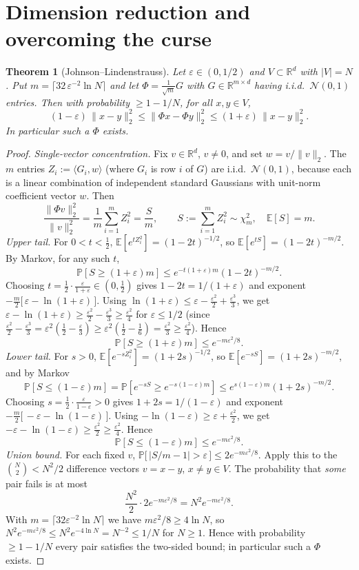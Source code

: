 \documentclass{amsart}
\newtheorem{theorem}{Theorem}
\newcommand{\R}{\mathbb{R}}
\newcommand{\E}{\mathbb{E}}
\renewcommand{\Pr}{\mathbb{P}}
\newcommand{\eps}{\varepsilon}
\begin{document}
\section{Dimension reduction and overcoming the curse}

\begin{theorem}[Johnson--Lindenstrauss]\label{thm:jl}
Let $\eps\in(0,1/2)$ and $V\subset\R^d$ with $|V|=N$.  Put
$m=\big\lceil 32\,\eps^{-2}\ln N\big\rceil$ and let $\Phi=\frac{1}{\sqrt m}G$ with
$G\in\R^{m\times d}$ having i.i.d.\ $\mathcal N(0,1)$ entries.  Then with probability
$\ge 1-1/N$, for all $x,y\in V$,
\[
(1-\eps)\,\|x-y\|_2^2 \le \|\Phi x-\Phi y\|_2^2 \le (1+\eps)\,\|x-y\|_2^2 .
\]
In particular such a $\Phi$ exists.
\end{theorem}
\begin{proof}
\emph{Single-vector concentration.}  Fix $v\in\R^d$, $v\ne 0$, and set
$w=v/\|v\|_2$.  The $m$ entries $Z_i:=\langle G_i,w\rangle$ (where $G_i$ is row $i$ of
$G$) are i.i.d.\ $\mathcal N(0,1)$, because each is a linear combination of independent
standard Gaussians with unit-norm coefficient vector $w$.  Then
\[
\frac{\|\Phi v\|_2^2}{\|v\|_2^2}=\frac1m\sum_{i=1}^m Z_i^2=\frac{S}{m},
\qquad S:=\sum_{i=1}^m Z_i^2\sim\chi^2_m,\quad \E[S]=m .
\]
\emph{Upper tail.}  For $0<t<\tfrac12$, $\E[e^{tZ_i^2}]=(1-2t)^{-1/2}$, so
$\E[e^{tS}]=(1-2t)^{-m/2}$.  By Markov, for any such $t$,
\[
\Pr[S\ge(1+\eps)m]\le e^{-t(1+\eps)m}(1-2t)^{-m/2}.
\]
Choosing $t=\tfrac12\cdot\tfrac{\eps}{1+\eps}\in(0,\tfrac12)$ gives $1-2t=1/(1+\eps)$
and exponent $-\tfrac m2\big[\,\eps-\ln(1+\eps)\,\big]$.  Using
$\ln(1+\eps)\le \eps-\tfrac{\eps^2}{2}+\tfrac{\eps^3}{3}$, we get
$\eps-\ln(1+\eps)\ge \tfrac{\eps^2}{2}-\tfrac{\eps^3}{3}\ge \tfrac{\eps^2}{4}$ for
$\eps\le 1/2$ (since $\tfrac{\eps^2}{2}-\tfrac{\eps^3}{3}=\eps^2(\tfrac12-\tfrac\eps3)
\ge\eps^2(\tfrac12-\tfrac16)=\tfrac{\eps^2}{3}\ge\tfrac{\eps^2}{4}$).  Hence
\[
\Pr[S\ge(1+\eps)m]\le e^{-m\eps^2/8}.
\]
\emph{Lower tail.}  For $s>0$, $\E[e^{-sZ_i^2}]=(1+2s)^{-1/2}$, so
$\E[e^{-sS}]=(1+2s)^{-m/2}$, and by Markov
\[
\Pr[S\le(1-\eps)m]=\Pr[e^{-sS}\ge e^{-s(1-\eps)m}]
\le e^{s(1-\eps)m}(1+2s)^{-m/2}.
\]
Choosing $s=\tfrac12\cdot\tfrac{\eps}{1-\eps}>0$ gives $1+2s=1/(1-\eps)$ and exponent
$-\tfrac m2\big[\,-\eps-\ln(1-\eps)\,\big]$.  Using
$-\ln(1-\eps)\ge \eps+\tfrac{\eps^2}{2}$, we get
$-\eps-\ln(1-\eps)\ge \tfrac{\eps^2}{2}\ge\tfrac{\eps^2}{4}$.  Hence
\[
\Pr[S\le(1-\eps)m]\le e^{-m\eps^2/8}.
\]
\emph{Union bound.}  For each fixed $v$,
$\Pr\big[\,|S/m-1|>\eps\,\big]\le 2e^{-m\eps^2/8}$.  Apply this to the
$\binom N2<N^2/2$ difference vectors $v=x-y$, $x\neq y\in V$.  The probability that
\emph{some} pair fails is at most
\[
\frac{N^2}{2}\cdot 2e^{-m\eps^2/8}=N^2 e^{-m\eps^2/8}.
\]
With $m=\lceil 32\eps^{-2}\ln N\rceil$ we have $m\eps^2/8\ge 4\ln N$, so
$N^2 e^{-m\eps^2/8}\le N^2 e^{-4\ln N}=N^{-2}\le 1/N$ for $N\ge 1$.  Hence with
probability $\ge 1-1/N$ every pair satisfies the two-sided bound; in particular such a
$\Phi$ exists.
\end{proof}
\end{document}
